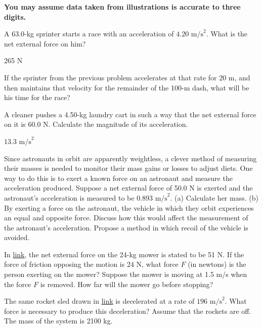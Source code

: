 \documentclass[
]{book}
\begin{document}
\textbf{You may assume data taken from illustrations is accurate to three
digits.}

\hypertarget{fs-id2025052}{}
\leavevmode{}%
A 63.0-kg sprinter starts a race with an acceleration of
\({4\text{.}\text{20\ m}\text{/s}^{2}}{}\). What is the net external force
on him?

\leavevmode{}%
265 N

\hypertarget{fs-id3046116}{}
\leavevmode{}%
If the sprinter from the previous problem accelerates at that rate for
20 m, and then maintains that velocity for the remainder of the 100-m
dash, what will be his time for the race?

\hypertarget{fs-id1947422}{}
\leavevmode{}%
A cleaner pushes a 4.50-kg laundry cart in such a way that the net
external force on it is 60.0 N. Calculate the magnitude of its
acceleration.

\leavevmode{}%
\(\text{13.3\ m/s}^{2}\)

\hypertarget{fs-id1829025}{}
\leavevmode{}%
Since astronauts in orbit are apparently weightless, a clever method of
measuring their masses is needed to monitor their mass gains or losses
to adjust diets. One way to do this is to exert a known force on an
astronaut and measure the acceleration produced. Suppose a net external
force of 50.0 N is exerted and the astronaut's acceleration is measured
to be \({0\text{.}\text{893\ m/s}^{2}}{}\). (a) Calculate her mass. (b) By
exerting a force on the astronaut, the vehicle in which they orbit
experiences an equal and opposite force. Discuss how this would affect
the measurement of the astronaut's acceleration. Propose a method in
which recoil of the vehicle is avoided.

\hypertarget{fs-id2052918}{}
\leavevmode{}%
In \protect\hyperlink{fs-id2602810}{link}, the net external force
on the 24-kg mower is stated to be 51 N. If the force of friction
opposing the motion is 24 N, what force \(F{}\) (in newtons) is the person
exerting on the mower? Suppose the mower is moving at 1.5 m/s when the
force \(F{}\) is removed. How far will the mower go before stopping?

\hypertarget{fs-id1995657}{}
\leavevmode{}%
The same rocket sled drawn in
\protect\hyperlink{fs-id2992955}{link} is decelerated at a rate
of \({1\text{96\ m/s}^{2}}{}\). What force is necessary to produce this
deceleration? Assume that the rockets are off. The mass of the system is
2100 kg.
\end{document}
